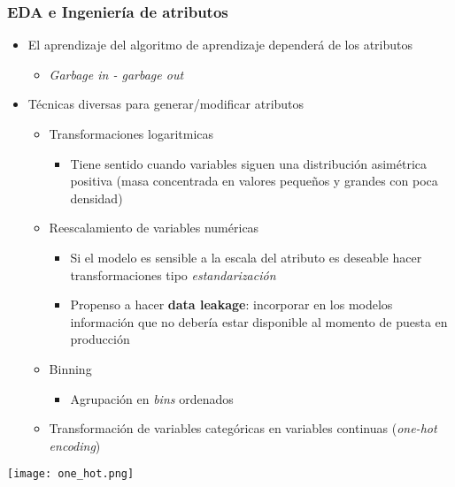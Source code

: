 \documentclass[leqno, 10pt, envcountsect]{beamer}
\numberwithin{equation}{section}
\theoremstyle{definition}
\theoremstyle{example}
\numberwithin{figure}{section}
\numberwithin{table}{section}
\let\olditem\item
\renewcommand{\item}{%
\olditem\vspace{1pt}}
\begin{document}
\begin{frame}[fragile=singleslide]
  \frametitle{EDA e Ingeniería de atributos}
  \begin{itemize}
    \item El aprendizaje del algoritmo de aprendizaje dependerá de los
      atributos
      \begin{itemize}
        \item \textit{Garbage in - garbage out}
      \end{itemize}
      \item Técnicas diversas para generar/modificar atributos
        \begin{itemize}
          \item Transformaciones logaritmicas
            \begin{itemize}
              \item Tiene sentido cuando variables siguen una distribución
                asimétrica positiva (masa concentrada en valores pequeños y
                grandes con poca densidad)
            \end{itemize}
          \item Reescalamiento de variables numéricas
            \begin{itemize}
              \item Si el modelo es sensible a la escala del atributo es
                deseable hacer transformaciones tipo \textit{estandarización}
              \item Propenso a hacer \textbf{data leakage}: incorporar en los
                modelos información que no debería estar disponible al momento
                de puesta en producción
            \end{itemize}
          \item Binning
            \begin{itemize}
              \item Agrupación en \textit{bins} ordenados
            \end{itemize}
          \item Transformación de variables categóricas en variables continuas
            (\textit{one-hot encoding})
      \end{itemize}
  \end{itemize}
  \begin{center}
    \texttt{[image: one\_hot.png]}
  \end{center}
\end{frame}
\end{document}
